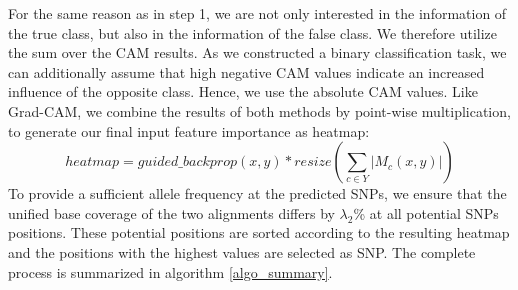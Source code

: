 \documentclass{article}
\begin{document}
For the same reason as in step 1, we are not only interested in the information of the true class, but also in the information of the false class. We therefore utilize the sum over the CAM results. As we constructed a binary classification task, we can additionally assume that high negative CAM values indicate an increased influence of the opposite class. Hence, we use the absolute CAM values.
Like Grad-CAM, we combine the results of both methods by point-wise multiplication, to generate our final input feature importance as heatmap:
\begin{equation}
    \label{eq:heatmap}
    heatmap=guided\_backprop(x,y)*resize(\sum\limits_{c\in Y}|M_{c}(x,y)|)
\end{equation}{}
To provide a sufficient allele frequency at the predicted SNPs, we ensure that the unified base coverage of the two alignments differs by $\lambda_{2}$\% at all potential SNPs positions. These potential positions are sorted according to the resulting heatmap and the positions with the highest values are selected as SNP. The complete process is summarized in algorithm \ref{algo_summary}.
\end{document}
